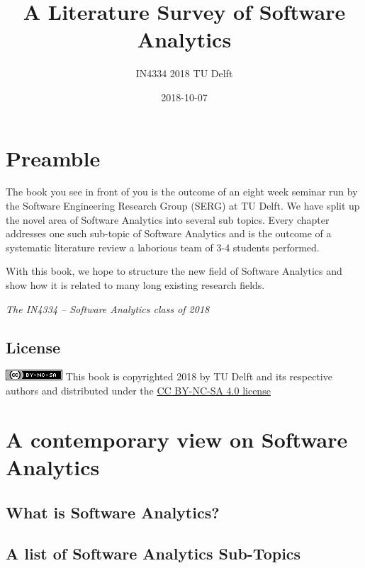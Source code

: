 \documentclass[]{book}
\title{A Literature Survey of Software Analytics}
\author{IN4334 2018 TU Delft}
\date{2018-10-07}
\begin{document}
\maketitle

{
\setcounter{tocdepth}{1}
\tableofcontents
}
\chapter{Preamble}\label{intro}

The book you see in front of you is the outcome of an eight week seminar
run by the Software Engineering Research Group (SERG) at TU Delft. We
have split up the novel area of Software Analytics into several sub
topics. Every chapter addresses one such sub-topic of Software Analytics
and is the outcome of a systematic literature review a laborious team of
3-4 students performed.

With this book, we hope to structure the new field of Software Analytics
and show how it is related to many long existing research fields.

\emph{The IN4334 -- Software Analytics class of 2018}

\section{License}\label{license}

\includegraphics{figures/cc-nc-sa.png} This book is copyrighted 2018 by
TU Delft and its respective authors and distributed under the
\href{https://creativecommons.org/licenses/by-nc-sa/4.0/}{CC BY-NC-SA
4.0 license}

\chapter{A contemporary view on Software
Analytics}\label{a-contemporary-view-on-software-analytics}

\section{What is Software Analytics?}\label{what-is-software-analytics}

\section{A list of Software Analytics
Sub-Topics}\label{a-list-of-software-analytics-sub-topics}
\end{document}
